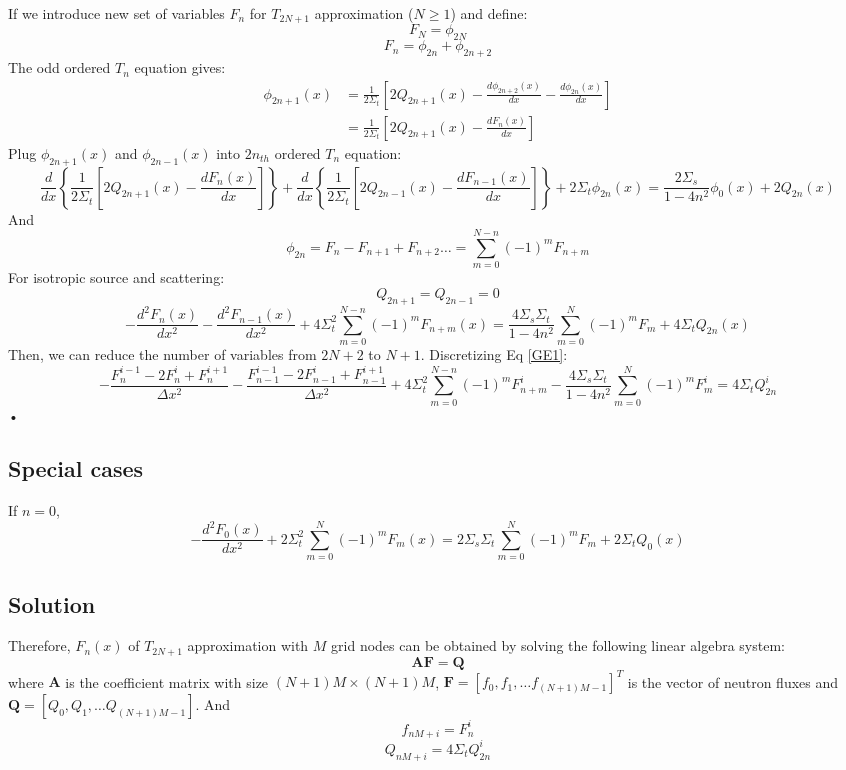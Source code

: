 \documentclass[11pt]{article}
\begin{document}
\begin{spacing}{1.5}
If we introduce new set of variables $F_n$ for $T_{2N+1}$ approximation ($N\ge1$) and define:
\[
F_N=\phi_{2N}
\]
\[
F_n=\phi_{2n}+\phi_{2n+2}
\]
The odd ordered $T_n$ equation gives:
\[
\begin{aligned}
\phi_{2n+1}(x)&=\frac{1}{2\Sigma_t}\left[2Q_{2n+1}(x)-\frac{d\phi_{2n+2}(x)}{dx}-\frac{d\phi_{2n}(x)}{dx}\right]\\
&=\frac{1}{2\Sigma_t}\left[2Q_{2n+1}(x)-\frac{dF_{n}(x)}{dx}\right]
\end{aligned}
\]
Plug $\phi_{2n+1}(x)$ and $\phi_{2n-1}(x)$ into $2n_{th}$ ordered $T_n$ equation:
\[
\frac{d}{dx}\left\{\frac{1}{2\Sigma_t}\left[2Q_{2n+1}(x)-\frac{dF_{n}(x)}{dx}\right]\right\}+\frac{d}{dx}\left\{\frac{1}{2\Sigma_t}\left[2Q_{2n-1}(x)-\frac{dF_{n-1}(x)}{dx}\right]\right\}+2\Sigma_t\phi_{2n}(x)=\frac{2\Sigma_s}{1-4n^2}\phi_0(x)+2Q_{2n}(x)
\]
And
\[
\phi_{2n}=F_n-F_{n+1}+F_{n+2}\dots=\sum_{m=0}^{N-n}(-1)^{m}F_{n+m}
\]
For isotropic source and scattering:
\[
Q_{2n+1}=Q_{2n-1}=0
\]
\begin{equation}\label{GE1}
\boxed{
-\frac{d^2F_{n}(x)}{dx^2}-\frac{d^2F_{n-1}(x)}{dx^2}+4\Sigma_t^2\sum_{m=0}^{N-n}(-1)^{m}F_{n+m}(x)=\frac{4\Sigma_s\Sigma_t}{1-4n^2}\sum_{m=0}^{N}(-1)^{m}F_{m}+4\Sigma_tQ_{2n}(x)
}
\end{equation}
Then, we can reduce the number of variables from $2N+2$ to $N+1$. Discretizing Eq \ref{GE1}:
\begin{equation}
\boxed{
-\frac{F_n^{i-1}-2F_n^{i}+F_n^{i+1}}{\Delta x^2}-\frac{F_{n-1}^{i-1}-2F_{n-1}^{i}+F_{n-1}^{i+1}}{\Delta x^2}+4\Sigma_t^2\sum_{m=0}^{N-n}(-1)^{m}F_{n+m}^i-\frac{4\Sigma_s\Sigma_t}{1-4n^2}\sum_{m=0}^{N}(-1)^{m}F_{m}^i=4\Sigma_tQ_{2n}^i
}
\end{equation}•
\subsection{Special cases}
If $n=0$,
\[
\boxed{
-\frac{d^2F_{0}(x)}{dx^2}+2\Sigma_t^2\sum_{m=0}^{N}(-1)^{m}F_{m}(x)=2\Sigma_s\Sigma_t\sum_{m=0}^{N}(-1)^{m}F_{m}+2\Sigma_tQ_{0}(x)
}
\]
\subsection{Solution}
Therefore, $F_n(x)$ of $T_{2N+1}$ approximation with $M$ grid nodes can be obtained by solving the following linear algebra system:
\[
\mathbf{A}\mathbf{F}=\mathbf{Q}
\]
where $\mathbf{A}$ is the coefficient matrix with size $(N+1)M\times(N+1)M$, $\mathbf{F}=[f_0,f_1,\dots f_{(N+1)M-1}]^T$ is the vector of neutron fluxes and $\mathbf{Q}=[Q_0,Q_1,\dots Q_{(N+1)M-1}]$. And
\[
f_{nM+i}=F_n^{i}
\]
\[
Q_{nM+i}=4\Sigma_tQ_{2n}^i
\]


\end{spacing}
\end{document}
